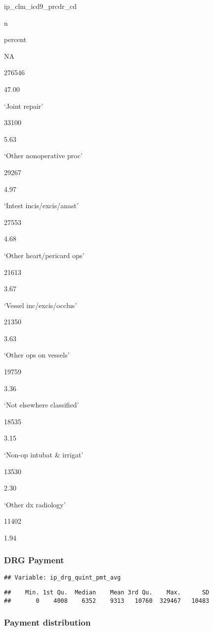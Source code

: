 \documentclass[]{article}
\begin{document}
ip\_clm\_icd9\_prcdr\_cd

n

percent

NA

276546

47.00

`Joint repair'

33100

5.63

`Other nonoperative proc'

29267

4.97

`Intest incis/excis/anast'

27553

4.68

`Other heart/pericard ops'

21613

3.67

`Vessel inc/excis/occlus'

21350

3.63

`Other ops on vessels'

19759

3.36

`Not elsewhere classified'

18535

3.15

`Non-op intubat \& irrigat'

13530

2.30

`Other dx radiology'

11402

1.94

\hypertarget{drg-payment}{%
\subsubsection{DRG Payment}\label{drg-payment}}

\begin{verbatim}
## Variable: ip_drg_quint_pmt_avg
\end{verbatim}

\begin{verbatim}
##    Min. 1st Qu.  Median    Mean 3rd Qu.    Max.      SD 
##       0    4008    6352    9313   10760  329467   10483
\end{verbatim}

\newpage

\hypertarget{payment-distribution}{%
\subsubsection{Payment distribution}\label{payment-distribution}}
\end{document}
